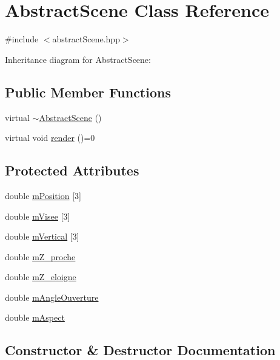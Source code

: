 \hypertarget{class_abstract_scene}{}\section{Abstract\+Scene Class Reference}
\label{class_abstract_scene}


{\ttfamily \#include $<$abstract\+Scene.\+hpp$>$}



Inheritance diagram for Abstract\+Scene\+:
\subsection*{Public Member Functions}
\begin{DoxyCompactItemize}
\item 
virtual \hyperlink{class_abstract_scene_a82b4811120763f71a5e81a9d72b339f3}{$\sim$\+Abstract\+Scene} ()
\item 
virtual void \hyperlink{class_abstract_scene_ae4f545c8335b65b42a6198ee09bf8084}{render} ()=0
\end{DoxyCompactItemize}
\subsection*{Protected Attributes}
\begin{DoxyCompactItemize}
\item 
double \hyperlink{class_abstract_scene_a98df5c05fd09171b9c29149764f12b26}{m\+Position} \mbox{[}3\mbox{]}
\item 
double \hyperlink{class_abstract_scene_aee359c5dfc0b10b8744ef8617d232a6b}{m\+Visee} \mbox{[}3\mbox{]}
\item 
double \hyperlink{class_abstract_scene_ae0ed7e7f39da2bd272e44f4343a82660}{m\+Vertical} \mbox{[}3\mbox{]}
\item 
double \hyperlink{class_abstract_scene_ab6ecf1a8af6498332c6ef0e972ea134f}{m\+Z\+\_\+proche}
\item 
double \hyperlink{class_abstract_scene_aef1c839431dde4df2ffd2567abf6c927}{m\+Z\+\_\+eloigne}
\item 
double \hyperlink{class_abstract_scene_a7629342355ad9927d411dc7dfb81559b}{m\+Angle\+Ouverture}
\item 
double \hyperlink{class_abstract_scene_a2b9a4bb018f75f5974ea922e8bf24f28}{m\+Aspect}
\end{DoxyCompactItemize}


\subsection{Constructor \& Destructor Documentation}
